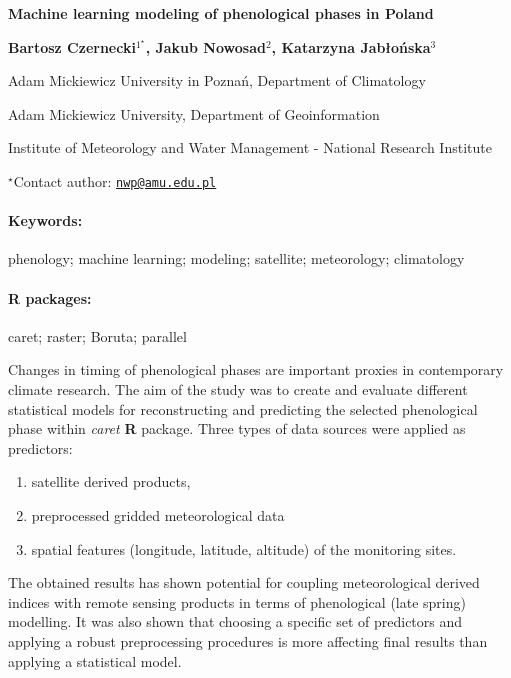 \documentclass[11pt, a4paper]{article}
\renewcommand{\title}[1]{\begin{center}{\bf \LARGE #1}\end{center}}
\newcommand{\keywords}{\paragraph{Keywords:}}
\newcommand{\packages}{\paragraph{R packages:}}
\providecommand{\tightlist}{%
  \setlength{\itemsep}{0pt}\setlength{\parskip}{0pt}}
\begin{document}
\pagestyle{empty}

\title{Machine learning modeling of phenological phases in Poland}

\begin{center}
  {\bf Bartosz Czernecki$^{1^\star}$, Jakub Nowosad$^{2}$, Katarzyna Jabłońska$^{3}$}
\end{center}

\vskip 0.3cm

\begin{affiliations}
\begin{enumerate}
\begin{minipage}{0.915\textwidth}
\centering
\item Adam Mickiewicz University in Poznań, Department of Climatology \\[-2pt]
\item Adam Mickiewicz University, Department of Geoinformation \\[-2pt]
\item Institute of Meteorology and Water Management - National Research
Institute \\[-2pt]
\end{minipage}
\end{enumerate}
$^\star$Contact author: \href{mailto:nwp@amu.edu.pl}{\nolinkurl{nwp@amu.edu.pl}}\\
\end{affiliations}

\vskip 0.5cm

\begin{minipage}{0.915\textwidth}
\keywords phenology; machine learning; modeling; satellite; meteorology;
climatology
\packages caret; raster; Boruta; parallel
\end{minipage}

\vskip 0.8cm

Changes in timing of phenological phases are important proxies in
contemporary climate research. The aim of the study was to create and
evaluate different statistical models for reconstructing and predicting
the selected phenological phase within \emph{caret} \textbf{R} package.
Three types of data sources were applied as predictors:

\begin{enumerate}
\def\labelenumi{\roman{enumi}.}
\tightlist
\item
  satellite derived products,
\item
  preprocessed gridded meteorological data
\item
  spatial features (longitude, latitude, altitude) of the monitoring
  sites.
\end{enumerate}

The obtained results has shown potential for coupling meteorological
derived indices with remote sensing products in terms of phenological
(late spring) modelling. It was also shown that choosing a specific set
of predictors and applying a robust preprocessing procedures is more
affecting final results than applying a statistical model.
\end{document}
